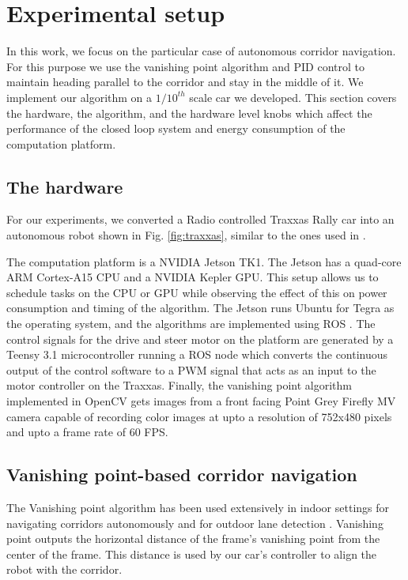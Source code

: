 \section{Experimental setup}

In this work, we focus on the particular case of autonomous corridor navigation. 
For this purpose we use the vanishing point algorithm and PID control to maintain heading parallel to the corridor and stay in the middle of it. We implement our algorithm on a $1/10^{th}$ scale car we developed. This section covers the hardware, the algorithm, and the hardware level knobs which affect the performance of the closed loop system and energy consumption of the computation platform.

\subsection{The hardware}

For our experiments, we converted a Radio controlled Traxxas Rally car into an autonomous robot shown in Fig. \ref{fig:traxxas}, similar to the ones used in \cite{racecar_mit}.

The computation platform is a NVIDIA Jetson TK1. 
The Jetson has a quad-core ARM Cortex-A15 CPU and a NVIDIA Kepler GPU. 
This setup allows us to schedule tasks on the CPU or GPU while observing the effect of this on power consumption and timing of the algorithm. 
The Jetson runs Ubuntu for Tegra as the operating system, and the algorithms are implemented using ROS \cite{ros}. The control signals for the drive and steer motor on the platform are generated by a Teensy 3.1 microcontroller running a ROS node which converts the continuous output of the control software to a PWM signal that acts as an input to the motor controller on the Traxxas. 
Finally, the vanishing point algorithm implemented in OpenCV \cite{opencv} gets images from a front facing Point Grey Firefly MV camera capable of recording color images at upto a resolution of 752x480 pixels and upto a frame rate of 60 FPS. 

\subsection{Vanishing point-based corridor navigation}

The Vanishing point algorithm \cite{VP1} has been used extensively in indoor settings for navigating corridors autonomously \cite{VP2, VP3} and for outdoor lane detection \cite{gallagher2002ground}. 
Vanishing point outputs the horizontal distance of the frame's vanishing point from the center of the frame. 
This distance is used by our car's controller to align the robot with the corridor. 

